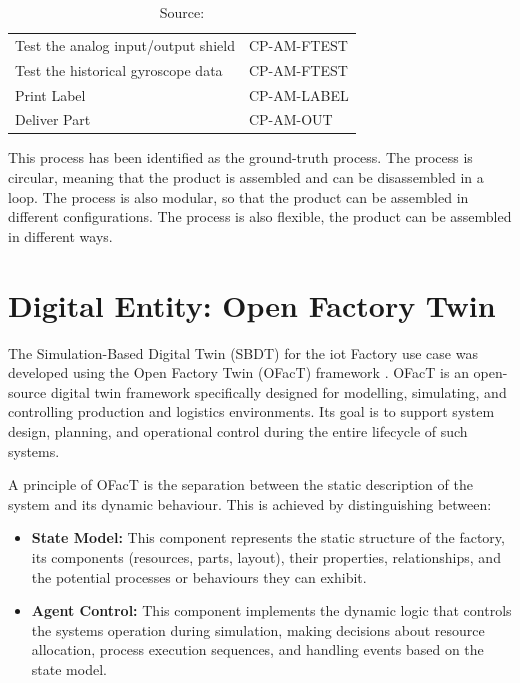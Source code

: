 \begin{table}[H]
\begin{tabular}{@{}p{}p{}@{}}
        Test the analog input/output shield           & CP-AM-FTEST                           \\
        Test the historical gyroscope data            & CP-AM-FTEST                           \\
        Print Label                                   & CP-AM-LABEL                           \\
        Deliver Part                                  & CP-AM-OUT                             \\
        \bottomrule
    \end{tabular}
    \caption*{Source: \Textcite{IoTFactory2024}}
\end{table}


This process has been identified as the ground-truth process. The process is circular, meaning that the product is assembled and can be disassembled in a loop. The process is also modular, so that the product can be assembled in different configurations. The process is also flexible, the product can be assembled in different ways.

\section{Digital Entity: Open Factory Twin}
\label{sec:automated-digital-twin}

The Simulation-Based Digital Twin (SBDT) for the \gls{iot} Factory use case was developed using the Open Factory Twin (OFacT) framework \autocite{ofact-intern}. OFacT is an open-source digital twin framework specifically designed for modelling, simulating, and controlling production and logistics environments. Its goal is to support system design, planning, and operational control during the entire lifecycle of such systems.

A principle of OFacT is the separation between the static description of the system and its dynamic behaviour. This is achieved by distinguishing between:

\begin{itemize}
    \item \textbf{State Model:} This component represents the static structure of the factory, its components (resources, parts, layout), their properties, relationships, and the potential processes or behaviours they can exhibit.
    \item \textbf{Agent Control:} This component implements the dynamic logic that controls the systems operation during simulation, making decisions about resource allocation, process execution sequences, and handling events based on the state model.
\end{itemize}

